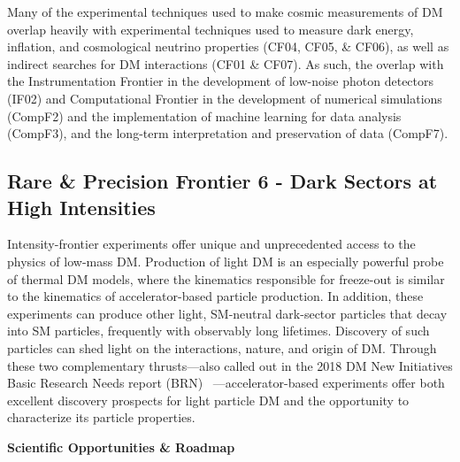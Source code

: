 \documentclass[nofootinbib]{article}
\begin{document}
Many of the experimental techniques used to make cosmic measurements of DM overlap heavily with experimental techniques used to measure dark energy, inflation, and cosmological neutrino properties (CF04, CF05, \& CF06), as well as indirect searches for DM interactions (CF01 \& CF07).
As such, the overlap with the Instrumentation Frontier in the development of low-noise photon detectors (IF02) and Computational Frontier in the development of numerical simulations (CompF2) and the implementation of machine learning for data analysis (CompF3), and the long-term interpretation and preservation of data (CompF7).



\subsection{Rare \& Precision Frontier 6 - Dark Sectors at High Intensities}
Intensity-frontier experiments offer unique and unprecedented access to the physics of low-mass DM.  Production of light DM is an especially powerful probe of thermal DM models, where the kinematics responsible for freeze-out is similar to the kinematics of accelerator-based particle production.  In addition, these experiments can produce other light, SM-neutral dark-sector particles that decay into SM particles, frequently with observably long lifetimes.  Discovery of such particles can shed light on the interactions, nature, and origin of DM.  Through these two complementary thrusts---also called out in the 2018 DM New Initiatives Basic Research Needs report (BRN) ~\cite{BRNreport}---accelerator-based experiments offer both excellent discovery prospects for light particle DM and the opportunity to characterize its particle properties. \vspace{1em}

\noindent \textbf{Scientific Opportunities \& Roadmap} 
\end{document}
